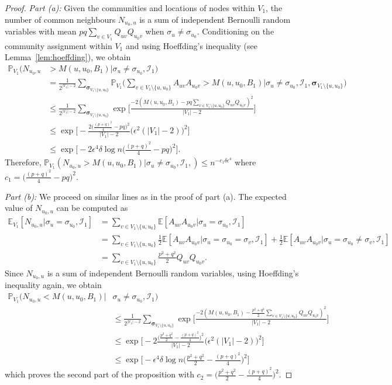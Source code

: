 \documentclass[letterpaper,11pt]{article}
\theoremstyle{definition}
\def\E{\mathbb{E}}
\def\P{\mathbb{P}}
\newcommand{\bsigma}{\bm{\sigma}}
\def\cI{\mathcal{I}}
\numberwithin{equation}{section}
\newcommand{\eps}{\epsilon}
\theoremstyle{definition}
\def\E{\mathbb{E}}
\def\P{\mathbb{P}}
\newcommand{\bsigma}{\bm{\sigma}}
\def\cI{\mathcal{I}}
\numberwithin{equation}{section}
\newcommand{\eps}{\epsilon}
\theoremstyle{thmstyletwo}%
\begin{document}
\begin{proof}
\emph{Part (a):} Given the communities and locations of nodes within $V_1$, the number of common neighbours $N_{u_0,u}$ is a sum of independent Bernoulli random variables with mean $pq\sum_{v\in V_1} Q_{uv}Q_{u_0v}$ when $\sigma_u\neq\sigma_{u_0}$. Conditioning on the community assignment within $V_1$ and using Hoeffding's inequality (see Lemma~\ref{lem:hoeffding}), we obtain
\begin{align*}
    \P_{V_1}(N_{u_0,u}&> M(u,u_0,B_1)\big| \sigma_u\ne\sigma_{u_0},\cI_1) \\
    &= \frac{1}{2^{|V_1|-2}} \sum_{\bsigma_{V_1\setminus \{u,u_0\}}} \P_{V_1}\bigg(\sum_{v\in V_1\setminus \{u,u_0\}} A_{uv}A_{u_0v} > M(u,u_0,B_1)\Big|\sigma_u\ne\sigma_{u_0},\cI_1,\bsigma_{V_1\setminus \{u,u_0\}}\bigg)\\
    &\le \frac{1}{2^{|V_1|-2}} \sum_{\bsigma_{V_1\setminus \{u,u_0\}}} \exp\bigg[\frac{-2(M(u,u_0,B_1)-pq\sum_{v\in V_1\setminus \{u,u_0\}} Q_{uv}Q_{u_0v})^2}{|V_1|-2}\bigg]\\
    &\le \exp\bigg[-\frac{2\big(\frac{(p+q)^2}{4}-pq\big)^2}{|V_1|-2} \big(\eps^2(|V_1|-2)\big)^2\bigg]\\
    &\le \exp\bigg[-2 \eps^4 \delta \log n \bigg(\frac{(p+q)^2}{4}-pq\bigg)^2  \bigg].
\end{align*}
Therefore, $\P_{V_1}(N_{u_0,u}> M(u,u_0,B_1)\big|\sigma_u\ne\sigma_{u_0},\cI_1,) \le n^{-c_1 \delta \eps^4}$ where $c_1 =  \big(\frac{(p+q)^2}{4}-pq\big)^2 $.

\emph{Part (b):}
We proceed on similar lines as in the proof of part (a). The expected value of $N_{u_0,u}$ can be computed as 
\begin{align*}
\E_{V_1}[N_{u_0,u} | \sigma_u=\sigma_{u_0},\cI_1] 
&= \sum_{v \in V_1\setminus \{u,u_0\}}\E [A_{uv}A_{u_0v}| \sigma_u=\sigma_{u_0},\cI_1] \\
&= \sum_{v \in V_1\setminus \{u,u_0\}}\frac{1}{2} \E [A_{uv}A_{u_0v}| \sigma_u=\sigma_{u_0}=\sigma_v,\cI_1] +\frac{1}{2} \E [A_{uv}A_{u_0v}| \sigma_u=\sigma_{u_0}\neq \sigma_v,\cI_1]\\
&= \sum_{v \in V_1\setminus \{u,u_0\}} \frac{p^2+q^2}{2}Q_{uv}Q_{u_0v}.
\end{align*}
Since $N_{u_0,u}$ is a sum of independent Bernoulli random variables, using Hoeffding's inequality again, we obtain
\begin{align*}
\P_{V_1}(N_{u_0,u} < M(u,u_0,B_1)\big|& \sigma_u\ne\sigma_{u_0},\cI_1) \\
&\le \frac{1}{2^{|V_1|-2}} \sum_{\bsigma_{V_1\setminus \{u,u_0\}}} \exp\bigg[\frac{-2(M(u,u_0,B_1)-\frac{p^2+q^2}{2}\sum_{v\in V_1\setminus \{u,u_0\}} Q_{uv}Q_{u_0v})^2}{|V_1|-2}\bigg]\\
&\le \exp\bigg[-2\frac{\big(\frac{p^2+q^2}{2}-\frac{(p+q)^2}{4}\big)^2}{|V_1|-2} \big(\eps^2(|V_1|-2)\big)^2\bigg]\\
&\le \exp\bigg[-\eps^4\delta \log n \bigg(\frac{p^2+q^2}{2}-\frac{(p+q)^2}{4}\bigg)^2  \bigg]
\end{align*}
which proves the second part of the proposition with $c_2= \big(\frac{p^2+q^2}{2}-\frac{(p+q)^2}{4}\big)^2 $.
\end{proof}
\end{document}
